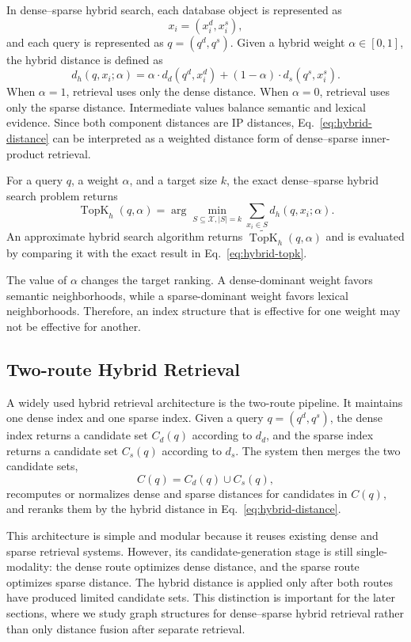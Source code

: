 In dense--sparse hybrid search, each database object is represented as
\begin{equation}
    x_i=(x_i^d,x_i^s),
\end{equation}
and each query is represented as $q=(q^d,q^s)$. Given a hybrid weight $\alpha\in[0,1]$, the hybrid distance is defined as
\begin{equation}
    d_h(q,x_i;\alpha)
    = \alpha \cdot d_d(q^d,x_i^d)
    + (1-\alpha) \cdot d_s(q^s,x_i^s).
    \label{eq:hybrid-distance}
\end{equation}
When $\alpha=1$, retrieval uses only the dense distance. When $\alpha=0$, retrieval uses only the sparse distance. Intermediate values balance semantic and lexical evidence. Since both component distances are IP distances, Eq.~\eqref{eq:hybrid-distance} can be interpreted as a weighted distance form of dense--sparse inner-product retrieval.

For a query $q$, a weight $\alpha$, and a target size $k$, the exact dense--sparse hybrid search problem returns
\begin{equation}
    \operatorname{TopK}_h(q,\alpha)
    = \arg\min_{S\subseteq\mathcal{X}, |S|=k}
    \sum_{x_i\in S} d_h(q,x_i;\alpha).
    \label{eq:hybrid-topk}
\end{equation}
An approximate hybrid search algorithm returns $\widetilde{\operatorname{TopK}}_h(q,\alpha)$ and is evaluated by comparing it with the exact result in Eq.~\eqref{eq:hybrid-topk}.

The value of $\alpha$ changes the target ranking. A dense-dominant weight favors semantic neighborhoods, while a sparse-dominant weight favors lexical neighborhoods. Therefore, an index structure that is effective for one weight may not be effective for another.

\subsection{Two-route Hybrid Retrieval}

A widely used hybrid retrieval architecture is the two-route pipeline. It maintains one dense index and one sparse index. Given a query $q=(q^d,q^s)$, the dense index returns a candidate set $C_d(q)$ according to $d_d$, and the sparse index returns a candidate set $C_s(q)$ according to $d_s$. The system then merges the two candidate sets,
\begin{equation}
    C(q)=C_d(q)\cup C_s(q),
\end{equation}
recomputes or normalizes dense and sparse distances for candidates in $C(q)$, and reranks them by the hybrid distance in Eq.~\eqref{eq:hybrid-distance}.

This architecture is simple and modular because it reuses existing dense and sparse retrieval systems. However, its candidate-generation stage is still single-modality: the dense route optimizes dense distance, and the sparse route optimizes sparse distance. The hybrid distance is applied only after both routes have produced limited candidate sets. This distinction is important for the later sections, where we study graph structures for dense--sparse hybrid retrieval rather than only distance fusion after separate retrieval.
